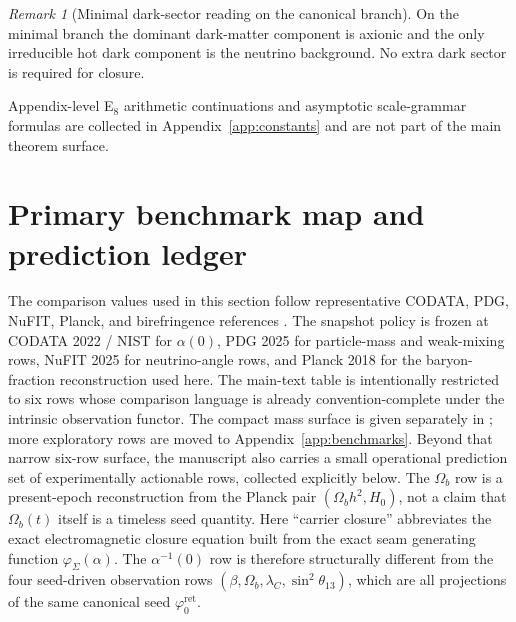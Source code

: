 \documentclass[11pt,a4paper]{article}
\theoremstyle{definition}
\theoremstyle{remark}
\newtheorem*{remark}{Remark}
\newcommand{\phiz}{\varphi_0^{\mathrm{ret}}}
\newcommand{\phiseam}{\varphi_{\Sigma}}
\begin{document}
\begin{remark}[Minimal dark-sector reading on the canonical branch]
On the minimal branch the dominant dark-matter component is axionic and the only irreducible
hot dark component is the neutrino background. No extra dark sector is required for closure.
\end{remark}

Appendix-level E$_8$ arithmetic continuations and asymptotic scale-grammar formulas are collected
in Appendix~\ref{app:constants} and are not part of the main theorem surface.

\section{Primary benchmark map and prediction ledger}

The comparison values used in this section follow representative CODATA, PDG, NuFIT, Planck,
and birefringence references
\cite{codata2022,pdg2025,nufit2025,planck2018,minamiKomatsu2020,eskilt2023,sullivan2025}. The
snapshot policy is frozen at CODATA 2022 / NIST for $\alpha(0)$, PDG 2025 for particle-mass and
weak-mixing rows, NuFIT 2025 for neutrino-angle rows, and Planck 2018 for the baryon-fraction
reconstruction used here. The main-text table is intentionally restricted to six rows whose
comparison language is already convention-complete under the intrinsic observation functor. The
compact mass surface is given separately in
; more exploratory rows are moved to
Appendix~\ref{app:benchmarks}. Beyond that narrow six-row surface, the manuscript also carries a
small operational prediction set of experimentally actionable rows, collected explicitly below.
The $\Omega_b$ row is a present-epoch reconstruction from the Planck pair $(\Omega_b h^2,H_0)$,
not a claim that $\Omega_b(t)$ itself is a timeless seed quantity. Here \enquote{carrier
closure} abbreviates the exact electromagnetic closure equation built from the exact seam
generating function $\phiseam(\alpha)$. The $\alpha^{-1}(0)$ row is therefore structurally
different from the four seed-driven observation rows
$(\beta,\Omega_b,\lambda_C,\sin^2\theta_{13})$, which are all projections of the same canonical
seed $\phiz$.
\end{document}
